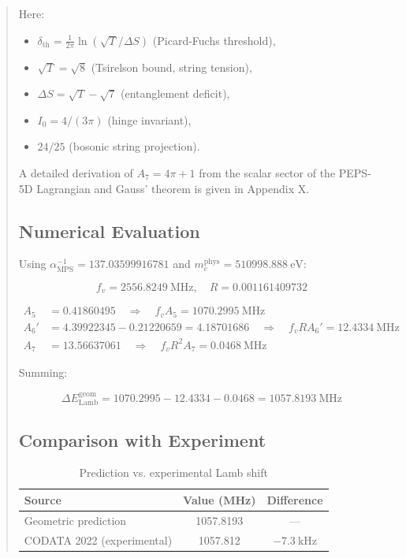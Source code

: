 \documentclass[12pt]{article}
\begin{document}
\begin{abstract}
Here:
\begin{itemize}
  \item \(\delta_{\text{th}} = \frac{1}{2\pi}\ln(\sqrt{T}/\Delta S)\) (Picard-Fuchs threshold),
  \item \(\sqrt{T} = \sqrt{8}\) (Tsirelson bound, string tension),
  \item \(\Delta S = \sqrt{T} - \sqrt{7}\) (entanglement deficit),
  \item \(I_0 = 4/(3\pi)\) (hinge invariant),
  \item \(24/25\) (bosonic string projection).
\end{itemize}

A detailed derivation of \(A_7 = 4\pi + 1\) from the scalar sector of the PEPS-5D Lagrangian and Gauss' theorem is given in Appendix X.

\subsection{Numerical Evaluation}

Using \(\alpha_{\text{MPS}}^{-1} = 137.03599916781\) and \(m_e^{\text{phys}} = 510998.888\ \text{eV}\):

\[
f_v = 2556.8249\ \text{MHz}, \quad R = 0.001161409732
\]

\begin{align}
A_5 &= 0.41860495 \quad \Rightarrow \quad f_v A_5 = 1070.2995\ \text{MHz} \\
A_6' &= 4.39922345 - 0.21220659 = 4.18701686 \quad \Rightarrow \quad f_v R A_6' = 12.4334\ \text{MHz} \\
A_7 &= 13.56637061 \quad \Rightarrow \quad f_v R^2 A_7 = 0.0468\ \text{MHz}
\end{align}

Summing:

\[
\Delta E_{\text{Lamb}}^{\text{geom}} = 1070.2995 - 12.4334 - 0.0468 = 1057.8193\ \text{MHz}
\]

\subsection{Comparison with Experiment}

\begin{table}[h]
\centering
\caption{Prediction vs. experimental Lamb shift}
\label{tab:lamb_comparison}
\begin{tabular}{lcc}
\toprule
\textbf{Source} & \textbf{Value (MHz)} & \textbf{Difference} \\
\midrule
Geometric prediction & 1057.8193 & — \\
CODATA 2022 (experimental) & 1057.812 & \(-7.3\ \text{kHz}\) \\
\hline
\end{tabular}
\end{table}


\end{abstract}
\end{document}
